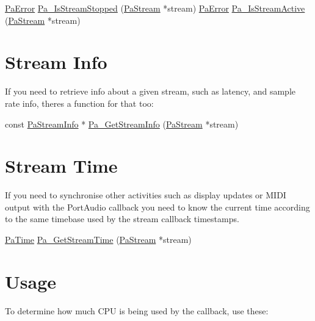 \begin{DoxyCode}
\hyperlink{portaudio_8h_a4949e4a8ef9f9dbe8cbee414ce69841d}{PaError}     \hyperlink{portaudio_8h_a52d778c985ae9d566de7e13529cc771f}{Pa\_IsStreamStopped} (\hyperlink{portaudio_8h_a19874734f89958fccf86785490d53b4c}{PaStream} *stream)
\hyperlink{portaudio_8h_a4949e4a8ef9f9dbe8cbee414ce69841d}{PaError}     \hyperlink{portaudio_8h_a1f8709c4971932643681a6f374c4bb5a}{Pa\_IsStreamActive} (\hyperlink{portaudio_8h_a19874734f89958fccf86785490d53b4c}{PaStream} *stream)
\end{DoxyCode}
\hypertarget{utility_functions_tut_util5}{}\section{Stream Info}\label{utility_functions_tut_util5}
If you need to retrieve info about a given stream, such as latency, and sample rate info, there\textquotesingle{}s a function for that too\+:


\begin{DoxyCode}
\textcolor{keyword}{const} \hyperlink{struct_pa_stream_info}{PaStreamInfo} *    \hyperlink{portaudio_8h_a3d9c4cbda4e9f381b76f287c3de8a758}{Pa\_GetStreamInfo} (\hyperlink{portaudio_8h_a19874734f89958fccf86785490d53b4c}{PaStream} *stream)
\end{DoxyCode}
\hypertarget{utility_functions_tut_util6}{}\section{Stream Time}\label{utility_functions_tut_util6}
If you need to synchronise other activities such as display updates or M\+I\+DI output with the Port\+Audio callback you need to know the current time according to the same timebase used by the stream callback timestamps.


\begin{DoxyCode}
\hyperlink{portaudio_8h_af17a7e6d0471a23071acf8dbd7bbe4bd}{PaTime}  \hyperlink{portaudio_8h_a2b3fb60e6949f37f7f134105ff425749}{Pa\_GetStreamTime} (\hyperlink{portaudio_8h_a19874734f89958fccf86785490d53b4c}{PaStream} *stream)
\end{DoxyCode}
\hypertarget{utility_functions_tut_util6CPU}{}\section{Usage}\label{utility_functions_tut_util6CPU}
To determine how much C\+PU is being used by the callback, use these\+:


